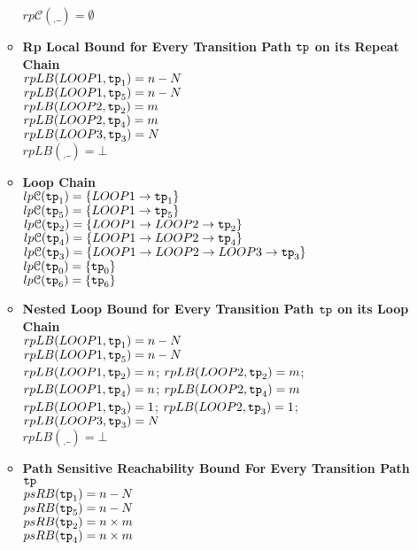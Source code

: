 \begin{enumerate}
\begin{itemize}
    $rp\mathcal{C}(_, \_) = \emptyset$ 
    \item \textbf{Rp Local Bound for Every Transition Path $\mathtt{tp}$ on its Repeat Chain}
    \\
    $rpLB(LOOP1, \mathtt{tp}_1) = n - N$ \\
    $rpLB(LOOP1, \mathtt{tp}_5) = n - N$ \\
    $rpLB(LOOP2, \mathtt{tp}_2) = m$ \\
    $rpLB(LOOP2, \mathtt{tp}_4) = m$ \\
    $rpLB(LOOP3, \mathtt{tp}_3) = N$ \\
    $rpLB(_, \_) = \bot $ 
    \item \textbf{Loop Chain}
    \\
    $lp\mathcal{C}(\mathtt{tp}_1) = \{LOOP1\to \mathtt{tp}_1\}$ \\
    $lp\mathcal{C}(\mathtt{tp}_5) = \{LOOP1\to \mathtt{tp}_5\}$ \\
    $lp\mathcal{C}(\mathtt{tp}_2) = \{LOOP1 \to LOOP2 \to \mathtt{tp}_2\}$ \\
    $lp\mathcal{C}(\mathtt{tp}_4) = \{LOOP1 \to LOOP2 \to \mathtt{tp}_4\}$ \\
    $lp\mathcal{C}(\mathtt{tp}_3) = \{LOOP1 \to LOOP2 \to LOOP3 \to \mathtt{tp}_3\}$ \\
    $lp\mathcal{C}(\mathtt{tp}_0) = \{\mathtt{tp}_0\}$ \\
    $lp\mathcal{C}(\mathtt{tp}_6) = \{\mathtt{tp}_6\}$ 
    \item \textbf{Nested Loop Bound for Every Transition Path $\mathtt{tp}$ on its Loop Chain}
    \\
    $rpLB(LOOP1, \mathtt{tp}_1) = n - N$ \\
    $rpLB(LOOP1, \mathtt{tp}_5) = n - N$ \\
    $rpLB(LOOP1, \mathtt{tp}_2) = n$;  $rpLB(LOOP2, \mathtt{tp}_2) = m$; \\
    $rpLB(LOOP1, \mathtt{tp}_4) = n$; $rpLB(LOOP2, \mathtt{tp}_4) = m$ \\
    $rpLB(LOOP1, \mathtt{tp}_3) = 1$; $rpLB(LOOP2, \mathtt{tp}_3) = 1$; $rpLB(LOOP3, \mathtt{tp}_3) = N$ \\
    $rpLB(_, \_) = \bot $ 
    \item \textbf{Path Sensitive Reachability Bound For Every Transition Path $\mathtt{tp}$ }
    \\
    $psRB(\mathtt{tp}_1) = n - N$ \\
    $psRB(\mathtt{tp}_5) = n - N$ \\
    $psRB(\mathtt{tp}_2) = n \times m$ \\
    $psRB(\mathtt{tp}_4) = n \times m$ \\

\end{itemize}
\end{enumerate}
